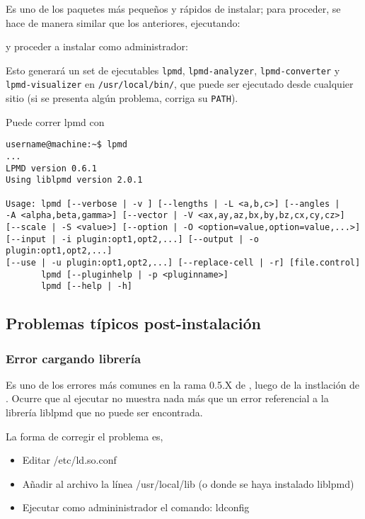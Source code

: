 Es uno de los paquetes m\'as peque\~nos y r\'apidos de instalar; para proceder, se hace de manera similar que los anteriores, ejecutando:


y proceder a instalar como administrador:


Esto generar\'a un set de ejecutables \verb|lpmd|, \verb|lpmd-analyzer|, \verb|lpmd-converter| y \verb|lpmd-visualizer| en \verb|/usr/local/bin/|, que puede ser ejecutado desde cualquier sitio (si se presenta alg\'un problema, corriga su \verb|PATH|).

Puede correr lpmd con

\begin{verbatim}
username@machine:~$ lpmd
...
LPMD version 0.6.1
Using liblpmd version 2.0.1

Usage: lpmd [--verbose | -v ] [--lengths | -L <a,b,c>] [--angles | 
-A <alpha,beta,gamma>] [--vector | -V <ax,ay,az,bx,by,bz,cx,cy,cz>] 
[--scale | -S <value>] [--option | -O <option=value,option=value,...>] 
[--input | -i plugin:opt1,opt2,...] [--output | -o plugin:opt1,opt2,...] 
[--use | -u plugin:opt1,opt2,...] [--replace-cell | -r] [file.control]
       lpmd [--pluginhelp | -p <pluginname>]
       lpmd [--help | -h]
\end{verbatim}

\subsection{Problemas t\'ipicos post-instalaci\'on}

\subsubsection{Error cargando librer\'ia}

Es uno de los errores m\'as comunes en la rama 0.5.X de {\lpmd}, luego de la instlaci\'on de {\lpmd}. Ocurre que al ejecutar {\lpmd} no muestra nada m\'as que un error referencial a la librer\'ia liblpmd que no puede ser encontrada.

La forma de corregir el problema es,

\begin{itemize}
 \item Editar /etc/ld.so.conf
 \item A\~nadir al archivo la l\'inea /usr/local/lib (o donde se haya instalado liblpmd)
 \item Ejecutar como admininistrador el comando: ldconfig
\end{itemize}

